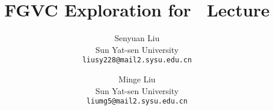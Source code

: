 \documentclass[10pt,twocolumn,letterpaper]{article}
\title{ FGVC Exploration for \confName~Lecture}
\author{
Senyuan Liu\\
Sun Yat-sen University\\
{\tt\small liusy228@mail2.sysu.edu.cn}
\and
Minge Liu\\
Sun Yat-sen University\\
{\tt\small liumg5@mail2.sysu.edu.cn}
}
\begin{document}
\twocolumn[
\maketitle

]
\clearpage





{
    \small
    
    
}

% 
\end{document}
